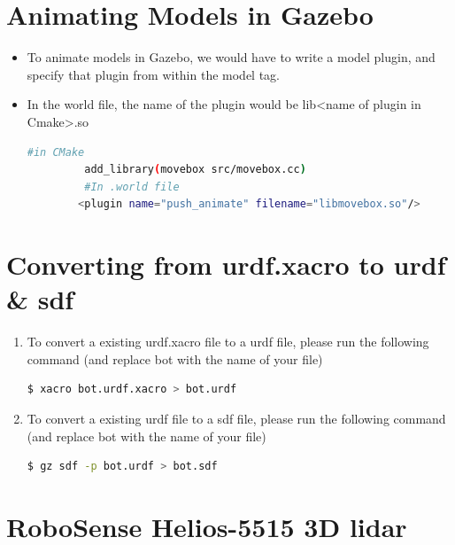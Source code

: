 \documentclass[11pt]{article}
\begin{document}
\section{Animating Models in Gazebo}
\begin{itemize}
 \item {
       To animate models in Gazebo, we would have to write a model plugin, and specify that plugin from within the model tag.
       }
 \item {
       In the world file, the name of the plugin would be
       lib<name of plugin in Cmake>.so
       
       \begin{lstlisting}[language=bash]
         #in CMake
         add_library(movebox src/movebox.cc)
         #In .world file
        <plugin name="push_animate" filename="libmovebox.so"/>
       \end{lstlisting}
       
       }
\end{itemize}
\section{Converting from urdf.xacro to urdf \& sdf}
\label{sec:conversion}
\begin{enumerate}
 \item {
       To convert a existing urdf.xacro file to a urdf file, please run the following command (and replace
       bot with the name of your file)
       \begin{lstlisting}[language=bash]
$ xacro bot.urdf.xacro > bot.urdf
\end{lstlisting}
       }
 \item {
       To convert a existing urdf file to a sdf file, please run the following command (and replace
       bot with the name of your file)
       \begin{lstlisting}[language=bash]
$ gz sdf -p bot.urdf > bot.sdf
\end{lstlisting}
       }
       
\end{enumerate}

\section{RoboSense Helios-5515 3D lidar}
\end{document}
